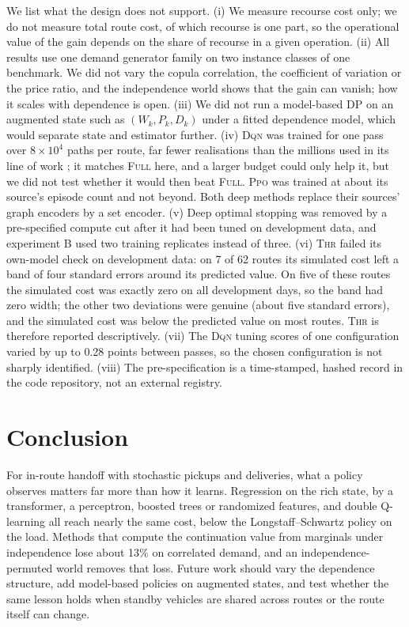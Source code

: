 \documentclass[trsc,dblanonrev]{informs4}
\newcommand{\Full}{\textsc{Full}}
\newcommand{\Thr}{\textsc{Thr}}
\newcommand{\Dqn}{\textsc{Dqn}}
\newcommand{\Ppo}{\textsc{Ppo}}
\begin{document}
We list what the design does not support. (i) We measure recourse cost only;
we do not measure total route cost, of which recourse is one part, so the
operational value of the gain depends on the share of recourse in a given
operation. (ii) All results use one demand generator family on two instance
classes of one benchmark. We did not vary the copula correlation, the
coefficient of variation or the price ratio, and the independence world
shows that the gain can vanish; how it scales with dependence is open. (iii)
We did not run a model-based DP on an augmented state such as $(W_k, P_k,
D_k)$ under a fitted dependence model, which would separate state and
estimator further. (iv) \Dqn{} was trained for one pass over $8 \times 10^4$
paths per route, far fewer realisations than the millions used in its line of
work \citep{dastpak2026deep}; it matches \Full{} here, and a larger budget
could only help it, but we did not test whether it would then beat \Full{}.
\Ppo{} was trained at about its source's episode count and not beyond. Both
deep methods replace their sources' graph encoders by a set encoder. (v) Deep
optimal stopping was removed by a pre-specified compute cut after it had been
tuned on development data, and experiment B used two training replicates
instead of three. (vi) \Thr{} failed its own-model check on development data:
on 7 of 62 routes its simulated cost left a band of four standard errors around
its predicted value. On five of these routes the simulated cost was exactly
zero on all development days, so the band had zero width; the other two
deviations were genuine (about five standard errors), and the simulated cost
was below the predicted value on most routes. \Thr{} is therefore reported
descriptively. (vii) The \Dqn{} tuning scores of one configuration varied by up
to 0.28 points between passes, so the chosen configuration is not sharply
identified. (viii) The pre-specification is a time-stamped, hashed record in
the code repository, not an external registry.

\section{Conclusion}\label{sec:conclusion}

For in-route handoff with stochastic pickups and deliveries, what a policy
observes matters far more than how it learns. Regression on the rich state, by
a transformer, a perceptron, boosted trees or randomized features, and double
Q-learning all reach nearly the same cost, \APrim{} below the
Longstaff--Schwartz policy on the load. Methods that compute the continuation
value from marginals under independence lose about 13\% on correlated demand,
and an independence-permuted world removes that loss. Future work should vary
the dependence structure, add model-based policies on augmented states, and
test whether the same lesson holds when standby vehicles are shared across
routes or the route itself can change.
\end{document}
